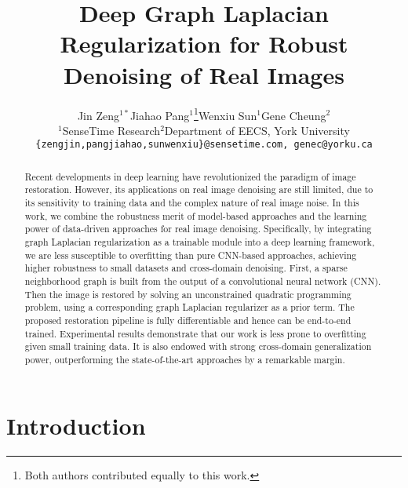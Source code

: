 \documentclass[10pt,twocolumn,letterpaper]{article}
\begin{document}
\title{Deep Graph Laplacian Regularization for Robust Denoising of Real Images}

\author{Jin Zeng$^{1*}$\hspace{35pt}Jiahao Pang$^1$\thanks{Both authors contributed equally to this work.}\hspace{35pt}Wenxiu Sun$^1$\hspace{35pt}Gene Cheung$^2$\\
$^1$SenseTime Research\hspace{30pt}$^2$Department of EECS, York University\\
{\tt\small \{zengjin,\hspace{3pt}pangjiahao,\hspace{3pt}sunwenxiu\}@sensetime.com, genec@yorku.ca}
}

\maketitle

\begin{abstract}
Recent developments in deep learning have revolutionized the paradigm of image restoration. 
However, its applications on real image denoising are still limited, due to its sensitivity to training data and the complex nature of real image noise.
In this work, we combine the robustness merit of model-based approaches and the learning power of data-driven approaches for real image denoising.
Specifically, by integrating graph Laplacian regularization as a trainable module into a deep learning framework, we are less susceptible to overfitting than pure CNN-based approaches, achieving higher robustness to small datasets and cross-domain denoising.
First, a sparse neighborhood graph is built from the output of a convolutional neural network (CNN). 
Then the image is restored by solving an unconstrained quadratic programming problem, using a corresponding graph Laplacian regularizer as a prior term. 
The proposed restoration pipeline is fully differentiable and hence can be end-to-end trained. 
Experimental results demonstrate that our work is less prone to overfitting given small training data. 
It is also endowed with strong cross-domain generalization power, outperforming the state-of-the-art approaches by a remarkable margin.
\end{abstract}

\vspace{-10pt}
\section{Introduction}\label{sec:intro}
\end{document}
